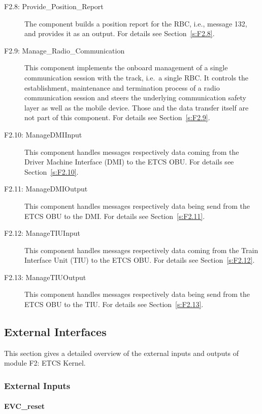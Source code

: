 \begin{description}
\item[F2.8: Provide\_Position\_Report] The component builds a position report for the RBC, i.e., message 132, and provides it as an output.  For details see Section~\ref{s:F2.8}.
\item[F2.9: Manage\_Radio\_Communication] This component implements the onboard management of a single communication session with the track, i.e.~a single RBC. It controls the establishment, maintenance and termination process of a radio communication session and steers the underlying communication safety layer as well as the mobile device. Those and the data transfer itself are not part of this component. For details see Section~\ref{s:F2.9}.
\item[F2.10: ManageDMIInput] This component handles messages respectively data coming from the Driver Machine Interface (DMI) to the ETCS OBU. For details see Section~\ref{s:F2.10}.
\item[F2.11: ManageDMIOutput] This component handles messages respectively data being send from the ETCS OBU to the DMI. For details see Section~\ref{s:F2.11}.
\item[F2.12: ManageTIUInput] This component handles messages respectively data coming from the Train Interface Unit (TIU) to the ETCS OBU. For details see Section~\ref{s:F2.12}.
\item[F2.13: ManageTIUOutput] This component handles messages respectively data being send from the ETCS OBU to the TIU. For details see Section~\ref{s:F2.13}.
\end{description}


\subsection{External Interfaces}
This section gives a detailed overview of the external inputs and outputs of module F2: ETCS Kernel.

\subsubsection{External Inputs}

\paragraph{EVC\_reset}

